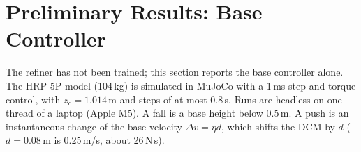 \documentclass[conference]{IEEEtran}
\begin{document}
\section{Preliminary Results: Base Controller}
\label{sec:results}

The refiner has not been trained; this section reports the base controller alone.
The HRP-5P model (104\,kg) is simulated in MuJoCo \cite{todorov2012mujoco} with a 1\,ms step and torque control, with $z_c=1.014$\,m and steps of at most 0.8\,s.
Runs are headless on one thread of a laptop (Apple M5).
A fall is a base height below 0.5\,m.
A push is an instantaneous change of the base velocity $\Delta v=\eta d$, which shifts the DCM by $d$ ($d=0.08$\,m is 0.25\,m/s, about 26\,N\,s).

\begin{table}[t]
\caption{Walking in simulation (base controller, no falls)}
\label{tab:walk}
\centering
\setlength{\tabcolsep}{3pt}
\end{table}
\end{document}
